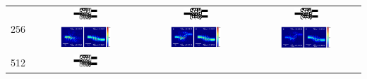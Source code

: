 \begin{landscape}
\begin{table}[ht]
\begin{tabular}{|c|c|c|c|}
      \multirow{2}{*}{256} &
      \includegraphics[width=0.24\textwidth]{image/results/wdm/PSO/visualize_eps_cont_256.png} &
      \includegraphics[width=0.24\textwidth]{image/results/wdm/PSO/visualize_eps_disc_256.png} &
      \includegraphics[width=0.24\textwidth]{image/results/wdm/PSO/visualize_eps_fab_256.png} \\
      \cline{2-4}
      &
      \includegraphics[width=0.50\textwidth]{image/results/wdm/PSO/visualize_field_cont_256.png} &
      \includegraphics[width=0.50\textwidth]{image/results/wdm/PSO/visualize_field_disc_256.png} &
      \includegraphics[width=0.50\textwidth]{image/results/wdm/PSO/visualize_field_fab_256.png} \\
    \hline
      \multirow{2}{*}{512} &
      \includegraphics[width=0.24\textwidth]{image/results/wdm/PSO/visualize_eps_cont_512.png} &

\end{tabular}
\end{table}
\end{landscape}
